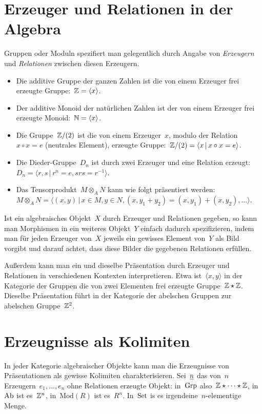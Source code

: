 \documentclass{uebblatt}
\begin{document}
\section*{Erzeuger und Relationen in der Algebra}

Gruppen oder Moduln spezifiert man gelegentlich durch Angabe von
\emph{Erzeugern} und \emph{Relationen} zwischen diesen Erzeugern.

\begin{itemize}
\item Die additive Gruppe der ganzen Zahlen ist die von einem Erzeuger frei
erzeugte Gruppe:~$\mathbb{Z} = \langle x \rangle$.
\item Der additive Monoid der natürlichen Zahlen ist der von einem Erzeuger
frei erzeugte Monoid:~$\mathbb{N} = \langle x \rangle$.
\item Die Gruppe~$\mathbb{Z}/(2)$ ist die von einem Erzeuger~$x$, modulo der
Relation~$x \circ x = e$ (neutrales Element), erzeugte Gruppe:~$\mathbb{Z}/(2) =
\langle x \,|\, x \circ x = e \rangle$.
\item Die Dieder-Gruppe~$D_n$ ist durch zwei Erzeuger und eine Relation
erzeugt:~$D_n = \langle r,s \,|\, r^n = e, srs = r^{-1} \rangle$.
\item Das Tensorprodukt~$M \otimes_A N$ kann wie folgt präsentiert werden:~$M
\otimes_A N = \langle (x,y) \,|\, x \in M, y \in N, (x,y_1+y_2) =
(x,y_1)+(x,y_2), \ldots \rangle$.
\end{itemize}

Ist ein algebraisches Objekt~$X$ durch Erzeuger und Relationen gegeben, so kann
man Morphismen in ein weiteres Objekt~$Y$ einfach dadurch spezifizieren, indem
man für jeden Erzeuger von~$X$ jeweils ein gewisses Element von~$Y$ als Bild
vorgibt und darauf achtet, dass diese Bilder die gegebenen Relationen erfüllen.

Außerdem kann man ein und dieselbe Präsentation durch Erzeuger und Relationen
in verschiedenen Kontexten interpretieren. Etwa ist~$\langle x,y \rangle$ in
der Kategorie der Gruppen die von zwei Elementen frei erzeugte Gruppe~$\mathbb{Z}
\star \mathbb{Z}$. Dieselbe Präsentation führt in der Kategorie der abelschen Gruppen
zur abelschen Gruppe~$\mathbb{Z}^2$.


\section*{Erzeugnisse als Kolimiten}

In jeder Kategorie algebraischer Objekte kann man die Erzeugnisse von
Präsentationen als gewisse Kolimiten charakterisieren. Sei~$\underline{n}$ das von~$n$
Erzeugern~$e_1,\ldots,e_n$ ohne Relationen erzeugte Objekt: in~$\mathrm{Grp}$ also~$\mathbb{Z}
\star \cdots \star \mathbb{Z}$, in~$\mathrm{Ab}$ ist es~$\mathbb{Z}^n$, in~$\mathrm{Mod}(R)$ ist
es~$R^n$. In~$\mathrm{Set}$ is es irgendeine~$n$-elementige Menge.
\end{document}
